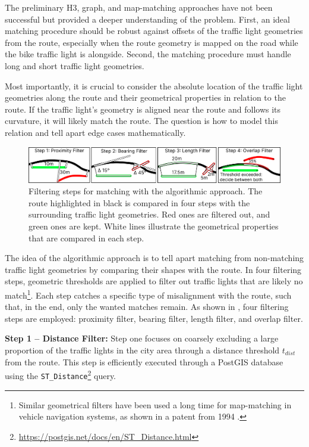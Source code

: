 The preliminary H3, graph, and map-matching approaches have not been successful but provided a deeper understanding of the problem. First, an ideal matching procedure should be robust against offsets of the traffic light geometries from the route, especially when the route geometry is mapped on the road while the bike traffic light is alongside. Second, the matching procedure must handle long and short traffic light geometries.

Most importantly, it is crucial to consider the absolute location of the traffic light geometries along the route and their geometrical properties in relation to the route. If the traffic light's geometry is aligned near the route and follows its curvature, it will likely match the route. The question is how to model this relation and tell apart edge cases mathematically.

\begin{figure}[t]
\centering
\includegraphics[width=\linewidth]{images/sg-matching-filters.pdf}
\caption{Filtering steps for matching with the algorithmic approach. The route highlighted in black is compared in four steps with the surrounding traffic light geometries. Red ones are filtered out, and green ones are kept. White lines illustrate the geometrical properties that are compared in each step.}
\label{fig:sg-matching-filters}
\end{figure}

The idea of the algorithmic approach is to tell apart matching from non-matching traffic light geometries by comparing their shapes with the route. In four filtering steps, geometric thresholds are applied to filter out traffic lights that are likely no match\footnote{Similar geometrical filters have been used a long time for map-matching in vehicle navigation systems, as shown in a patent from 1994 \cite{honey_vorrichtung_1994}.}. Each step catches a specific type of misalignment with the route, such that, in the end, only the wanted matches remain. As shown in , four filtering steps are employed: proximity filter, bearing filter, length filter, and overlap filter.

\textbf{\color{cidarkblue}Step 1 -- Distance Filter:} Step one focuses on coarsely excluding a large proportion of the traffic lights in the city area through a distance threshold $t_{dist}$ from the route. This step is efficiently executed through a PostGIS database using the \texttt{ST\_Distance}\footnote{\url{https://postgis.net/docs/en/ST\_Distance.html}} query.

